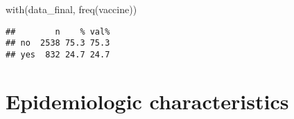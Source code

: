 \documentclass[
]{article}
\newenvironment{Shaded}{\begin{snugshade}}{\end{snugshade}}
\newcommand{\FunctionTok}[1]{\textcolor[rgb]{0.00,0.00,0.00}{#1}}
\newcommand{\NormalTok}[1]{#1}
\begin{document}
\begin{Shaded}
\begin{Highlighting}[]
\FunctionTok{with}\NormalTok{(data\_final, }\FunctionTok{freq}\NormalTok{(vaccine))}
\end{Highlighting}
\end{Shaded}

\begin{verbatim}
##        n    % val%
## no  2538 75.3 75.3
## yes  832 24.7 24.7
\end{verbatim}

\hypertarget{epidemiologic-characteristics}{%
\section{Epidemiologic
characteristics}\label{epidemiologic-characteristics}}
\end{document}

